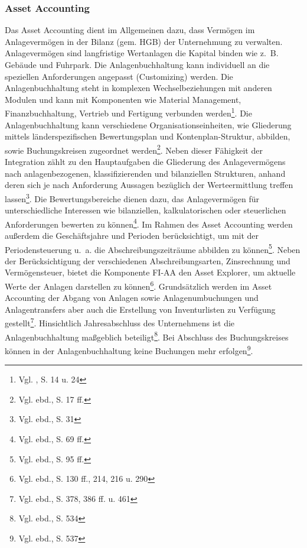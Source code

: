 \subsubsection{Asset Accounting} %
Das Asset Accounting dient im Allgemeinen dazu, dass Vermögen im Anlagevermögen in der Bilanz (gem. HGB) der Unternehmung zu verwalten. Anlagevermögen sind langfristige Wertanlagen die Kapital binden wie z.~B. Gebäude und Fuhrpark. Die Anlagenbuchhaltung kann individuell an die speziellen Anforderungen angepasst (Customizing) werden. 
Die Anlagenbuchhaltung steht in komplexen Wechselbeziehungen mit anderen Modulen und kann mit Komponenten wie Material Management, Finanzbuchhaltung, Vertrieb und Fertigung verbunden werden\footnote{Vgl. \cite{SAPFIAA2001}, S. 14 u. 24}. Die Anlagenbuchhaltung kann verschiedene Organisationseinheiten, wie Gliederung mittels länderspezifischen Bewertungsplan und Kontenplan-Struktur, abbilden, sowie Buchungskreisen zugeordnet werden\footnote{Vgl. ebd., S. 17 ff.}.
Neben dieser Fähigkeit der Integration zählt zu den Hauptaufgaben die Gliederung des Anlagevermögens nach anlagenbezogenen, klassifizierenden und bilanziellen Strukturen, anhand deren sich je nach Anforderung Aussagen bezüglich der Werteermittlung treffen lassen\footnote{Vgl. ebd., S. 31}. Die Bewertungsbereiche dienen dazu, das Anlagevermögen für unterschiedliche Interessen wie bilanziellen, kalkulatorischen oder steuerlichen Anforderungen bewerten zu können\footnote{Vgl. ebd., S. 69 ff.}.
Im Rahmen des Asset Accounting werden außerdem die Geschäftsjahre und Perioden berücksichtigt, um mit der Periodensteuerung u.~a. die Abschreibungszeiträume abbilden zu können\footnote{Vgl. ebd., S. 95 ff.}. Neben der Berücksichtigung der verschiedenen Abschreibungsarten, Zinsrechnung und Vermögensteuer, bietet die Komponente FI-AA den Asset Explorer, um aktuelle Werte der Anlagen darstellen zu können\footnote{Vgl. ebd., S. 130 ff., 214, 216 u. 290}. Grundsätzlich werden im Asset Accounting der Abgang von Anlagen sowie Anlagenumbuchungen und Anlagentransfers aber auch die Erstellung von Inventurlisten zu Verfügung gestellt\footnote{Vgl. ebd., S. 378, 386 ff. u. 461}.
Hinsichtlich Jahresabschluss des Unternehmens ist die Anlagenbuchhaltung maßgeblich beteiligt\footnote{Vgl. ebd., S. 534}. Bei Abschluss des Buchungskreises können in der Anlagenbuchhaltung keine Buchungen mehr erfolgen\footnote{Vgl. ebd., S. 537}.

